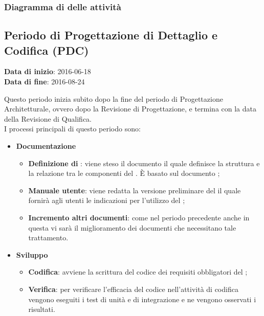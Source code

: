 		\subsubsection{Diagramma di  delle attività}
		
		
		
	\subsection{Periodo di Progettazione di Dettaglio e Codifica (PDC)}
	\begin{center}
		\textbf{Data di inizio}: 2016-06-18 \\
		\textbf{Data di fine}: 2016-08-24 \\
	\end{center}
	Questo periodo inizia subito dopo la fine del periodo di Progettazione Architetturale, ovvero dopo la Revisione di Progettazione, e termina con la data della Revisione di Qualifica. \\
	I processi principali di questo periodo sono: 
		\begin{itemize}
			\item \textbf{Documentazione} 
			\att
			\begin{itemize} 
				\item \textbf{Definizione di }: viene steso il documento \DPdocRQ{} il quale definisce la struttura e la relazione tra le componenti del . È basato sul documento \STdocRQ;
				\item \textbf{Manuale utente}: viene redatta la versione preliminare del \MUdocRQ{} il quale fornirà agli utenti le indicazioni per l'utilizzo del ;
				\item \textbf{Incremento altri documenti}: come nel periodo precedente anche in questa vi sarà il miglioramento dei documenti che necessitano tale trattamento.
			\end{itemize}
			\item \textbf{Sviluppo}
			\att
			\begin{itemize}
				\item \textbf{Codifica}: avviene la scrittura del codice dei requisiti obbligatori del ;
				\item \textbf{Verifica}: per verificare l'efficacia del codice  nell'attività di codifica vengono eseguiti i test di unità e di integrazione e ne vengono osservati i risultati. 
			\end{itemize}
		\end{itemize}
